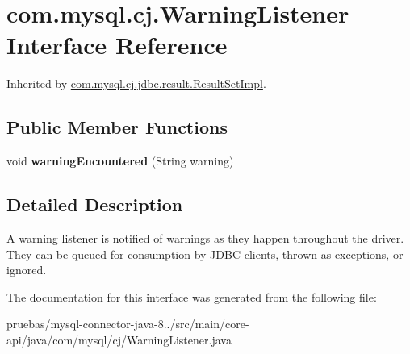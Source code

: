 \hypertarget{interfacecom_1_1mysql_1_1cj_1_1_warning_listener}{}\section{com.\+mysql.\+cj.\+Warning\+Listener Interface Reference}
\label{interfacecom_1_1mysql_1_1cj_1_1_warning_listener}


Inherited by \mbox{\hyperlink{classcom_1_1mysql_1_1cj_1_1jdbc_1_1result_1_1_result_set_impl}{com.\+mysql.\+cj.\+jdbc.\+result.\+Result\+Set\+Impl}}.

\subsection*{Public Member Functions}
\begin{DoxyCompactItemize}
\item 
\mbox{\label{interfacecom_1_1mysql_1_1cj_1_1_warning_listener_a28ab01ad54f9489d0b720ccf35d5d0bc}} 
void {\bfseries warning\+Encountered} (String warning)
\end{DoxyCompactItemize}


\subsection{Detailed Description}
A warning listener is notified of warnings as they happen throughout the driver. They can be queued for consumption by J\+D\+BC clients, thrown as exceptions, or ignored. 

The documentation for this interface was generated from the following file\+:\begin{DoxyCompactItemize}
\item 
pruebas/mysql-\/connector-\/java-\/8../src/main/core-\/api/java/com/mysql/cj/Warning\+Listener.\+java\end{DoxyCompactItemize}
